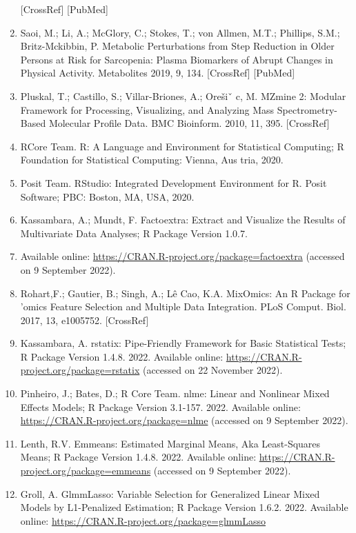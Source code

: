 \documentclass[journal=jacsat,manuscript=article]{achemso}
\begin{document}
\begin{enumerate}
  {[}CrossRef{]} {[}PubMed{]}
\item
  Saoi, M.; Li, A.; McGlory, C.; Stokes, T.; von Allmen, M.T.; Phillips,
  S.M.; Britz-Mckibbin, P. Metabolic Perturbations from Step Reduction
  in Older Persons at Risk for Sarcopenia: Plasma Biomarkers of Abrupt
  Changes in Physical Activity. Metabolites 2019, 9, 134. {[}CrossRef{]}
  {[}PubMed{]}
\item
  Pluskal, T.; Castillo, S.; Villar-Briones, A.; Orešiˇ c, M. MZmine 2:
  Modular Framework for Processing, Visualizing, and Analyzing Mass
  Spectrometry-Based Molecular Profile Data. BMC Bioinform. 2010, 11,
  395. {[}CrossRef{]}
\item
  RCore Team. R: A Language and Environment for Statistical Computing; R
  Foundation for Statistical Computing: Vienna, Aus tria, 2020.
\item
  Posit Team. RStudio: Integrated Development Environment for R. Posit
  Software; PBC: Boston, MA, USA, 2020.
\item
  Kassambara, A.; Mundt, F. Factoextra: Extract and Visualize the
  Results of Multivariate Data Analyses; R Package Version 1.0.7.
\item
  Available online: \url{https://CRAN.R-project.org/package=factoextra}
  (accessed on 9 September 2022).
\item
  Rohart,F.; Gautier, B.; Singh, A.; Lê Cao, K.A. MixOmics: An R Package
  for 'omics Feature Selection and Multiple Data Integration. PLoS
  Comput. Biol. 2017, 13, e1005752. {[}CrossRef{]}
\item
  Kassambara, A. rstatix: Pipe-Friendly Framework for Basic Statistical
  Tests; R Package Version 1.4.8. 2022. Available online:
  \url{https://CRAN.R-project.org/package=rstatix} (accessed on 22
  November 2022).
\item
  Pinheiro, J.; Bates, D.; R Core Team. nlme: Linear and Nonlinear Mixed
  Effects Models; R Package Version 3.1-157. 2022. Available online:
  \url{https://CRAN.R-project.org/package=nlme} (accessed on 9 September
  2022).
\item
  Lenth, R.V. Emmeans: Estimated Marginal Means, Aka Least-Squares
  Means; R Package Version 1.4.8. 2022. Available online:
  \url{https://CRAN.R-project.org/package=emmeans} (accessed on 9
  September 2022).
\item
  Groll, A. GlmmLasso: Variable Selection for Generalized Linear Mixed
  Models by L1-Penalized Estimation; R Package Version 1.6.2. 2022.
  Available online: \url{https://CRAN.R-project.org/package=glmmLasso}

\end{enumerate}
\end{document}
